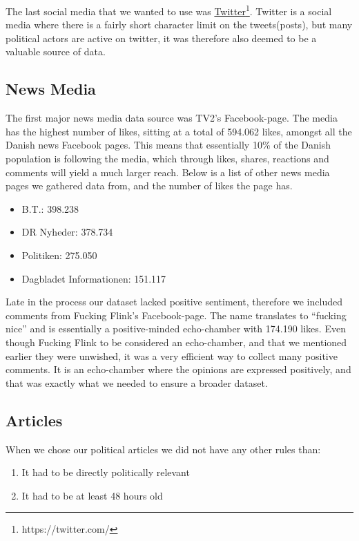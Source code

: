 The last social media that we wanted to use was \href{https://twitter.com/}{Twitter}\footnote{https://twitter.com/}. Twitter is a social media where there is a fairly short character limit on the tweets(posts), but many political actors are active on twitter, it was therefore also deemed to be a valuable source of data.


\subsection{News Media}

The first major news media data source was TV2’s Facebook-page. The media has the highest number of likes,  sitting at a total of 594.062 likes\cite{tv2}, amongst all the Danish news Facebook pages. This means that essentially 10\% of the Danish population is following the media, which through likes, shares, reactions and comments will yield a much larger reach. Below is a list of other news media pages we gathered data from, and the number of likes the page has.

\begin{itemize}
	\item B.T.: 398.238 \cite{bt}
	\item DR Nyheder: 378.734 \cite{dr}
	\item Politiken: 275.050 \cite{politiken}
	\item Dagbladet Informationen: 151.117 \cite{dagblad}
	
\end{itemize}

Late in the process our dataset lacked positive sentiment, therefore we included comments from Fucking Flink’s Facebook-page. The name translates to “fucking nice” and is essentially a positive-minded echo-chamber with 174.190 likes\cite{ff}. Even though Fucking Flink to be considered an echo-chamber, and that we mentioned earlier they were unwished, it was a very efficient way to collect many positive comments. It is an echo-chamber where the opinions are expressed positively, and that was exactly what we needed to ensure a broader dataset. 
\subsection{Articles}

When we chose our political articles we did not have any other rules than:
\begin{enumerate}
	\item It had to be directly politically relevant
	\item It had to be at least 48 hours old
\end{enumerate}

